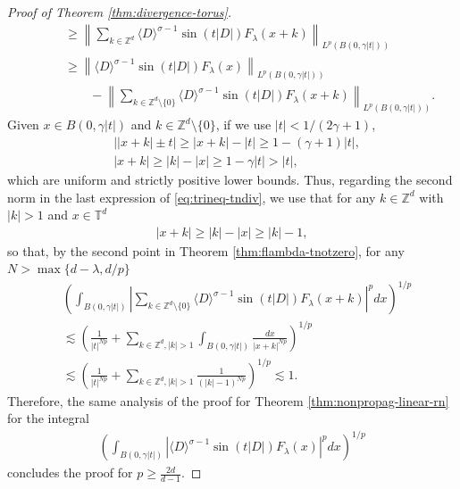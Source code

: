 \documentclass[a4paper, reqno, 11pt]{amsart}
\theoremstyle{definition}
\begin{document}
\begin{proof}[Proof of Theorem \ref{thm:divergence-torus}]
\begin{align}
&\qquad  \geq \left\| \sum_{k \in \mathbb{Z}^d} \langle D \rangle^{\sigma-1} \sin(t|D|) F_{\lambda}(x+k)  \right\|_{L^p(B(0,\gamma |t|))} \nonumber \\
&\qquad \geq \left\|  \langle D \rangle^{\sigma-1} \sin(t|D|) F_{\lambda}(x)  \right\|_{L^p(B(0,\gamma |t|))} \nonumber \\
&\qquad \qquad - \left\| \sum_{k \in \mathbb{Z}^d \setminus \{0\}} \langle D \rangle^{\sigma-1} \sin(t|D|) F_{\lambda}(x+k)  \right\|_{L^p(B(0,\gamma |t|))}.
\end{align}
Given $x \in B(0,\gamma |t|)$ and $k \in \mathbb{Z}^d \setminus \{0\}$, if we use $|t| < 1/(2\gamma+1)$,
\begin{align*}
&\left| |x+k| \pm t\right| \geq |x+k| - |t| \geq 1 - (\gamma + 1) |t|, \nonumber \\
& |x+k| \geq |k| - |x| \geq 1 - \gamma |t| > |t|,
\end{align*}
which are uniform and strictly positive lower bounds. Thus, regarding the second norm in the last expression of \eqref{eq:trineq-tndiv}, we use that for any $k \in \mathbb{Z}^d$ with $|k| > 1$ and $x \in \mathbb{T}^d$
\begin{align*}
|x + k| \geq |k| - |x| \geq |k| - 1,
\end{align*}
so that, by the second point in Theorem \ref{thm:flambda-tnotzero}, for any $N > \max\{d - \lambda,d/p\}$
\begin{align*}
&\left( \int_{B(0,\gamma |t|)} \left| \sum_{k \in \mathbb{Z}^d \setminus \{0\}} \langle D \rangle^{\sigma-1} \sin(t|D|) F_{\lambda}(x+k) \right|^p dx \right)^{1/p} \nonumber \\
&\lesssim \left(  \frac{1}{|t|^{Np}} + \sum_{k \in \mathbb{Z}^d, |k| > 1} \int_{B(0,\gamma |t|)} \frac{dx}{|x + k|^{Np}} \right)^{1/p} \nonumber \\
&\lesssim \left( \frac{1}{|t|^{Np}} + \sum_{k \in \mathbb{Z}^d, |k| > 1} \frac{1}{(|k| - 1)^{Np}}  \right)^{1/p} \lesssim 1.
\end{align*}
Therefore, the same analysis of the proof for Theorem \ref{thm:nonpropag-linear-rn} for the integral
\begin{align*}
\left( \int_{B(0,\gamma |t|)} \left| \langle D \rangle^{\sigma-1} \sin(t|D|) F_{\lambda}(x)  \right|^p dx \right)^{1/p}
\end{align*}
concludes the proof for $p \geq \frac{2d}{d-1}$. 


\end{proof}
\end{document}
